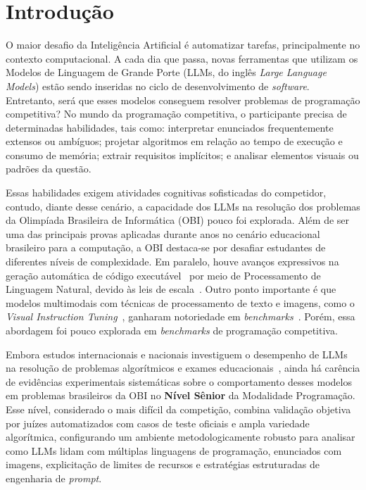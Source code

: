 \chapter{Introdução}\label{cap:introducao}

O maior desafio da Inteligência Artificial é automatizar tarefas, principalmente no contexto computacional. A cada dia que passa, novas ferramentas que utilizam os Modelos de Linguagem de Grande Porte (LLMs, do inglês \textit{Large Language Models}) estão sendo inseridas no ciclo de desenvolvimento de \textit{software}. Entretanto, será que esses modelos conseguem resolver problemas de programação competitiva? No mundo da programação competitiva, o participante precisa de determinadas habilidades, tais como: interpretar enunciados frequentemente extensos ou ambíguos; projetar algoritmos em relação ao tempo de execução e consumo de memória; extrair requisitos implícitos; e analisar elementos visuais ou padrões da questão.

Essas habilidades exigem atividades cognitivas sofisticadas do competidor, contudo, diante desse cenário, a capacidade dos LLMs na resolução dos problemas da Olimpíada Brasileira de Informática (OBI) pouco foi explorada. Além de ser uma das principais provas aplicadas durante anos no cenário educacional brasileiro para a computação, a OBI destaca-se por desafiar estudantes de diferentes níveis de complexidade. Em paralelo, houve avanços expressivos na geração automática de código executável~\citep{chen2021evaluating, Mendoza2024Comparative} por meio de Processamento de Linguagem Natural, devido às leis de escala~\citep{kaplan2020scaling}. Outro ponto importante é que modelos multimodais com técnicas de processamento de texto e imagens, como o \textit{Visual Instruction Tuning}~\citep{Liu2023VisualIT}, ganharam notoriedade em \textit{benchmarks}~\citep{Fu2023MMEAC,Lu2023MathVistaEM}. Porém, essa abordagem foi pouco explorada em \textit{benchmarks} de programação competitiva.

Embora estudos internacionais e nacionais investiguem o desempenho de LLMs na resolução de problemas algorítmicos e exames educacionais~\citep{chen2021evaluating,zheng2025livecodebench,li2024evaluating,mendonca2024evaluating,viegas2025assessing,almeida2023bluex}, ainda há carência de evidências experimentais sistemáticas sobre o comportamento desses modelos em problemas brasileiros da OBI no \textbf{Nível Sênior} da Modalidade Programação. Esse nível, considerado o mais difícil da competição, combina validação objetiva por juízes automatizados com casos de teste oficiais e ampla variedade algorítmica, configurando um ambiente metodologicamente robusto para analisar como LLMs lidam com múltiplas linguagens de programação, enunciados com imagens, explicitação de limites de recursos e estratégias estruturadas de engenharia de \textit{prompt}.


